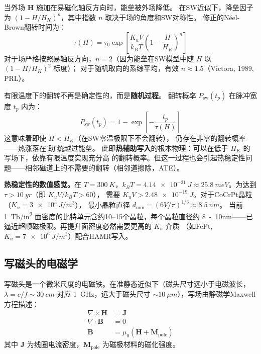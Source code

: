 \documentclass[11pt,a4paper,twoside]{article}
\theoremstyle{definition}
\theoremstyle{plain}
\theoremstyle{remark}
\begin{document}
当外场 $\mathbf{H}$ 施加在易磁化轴反方向时，能垒被外场降低。
在SW近似下，降垒因子为 $(1 - H/H_K)^n$，其中指数 $n$ 取决于场的角度和SW对称性。
修正的N\'{e}el-Brown翻转时间为：
\begin{equation}\label{eq:neel-brown}
  \tau(H) = \tau_0 \exp\!\left[ \frac{K_u V}{k_B T}
            \left( 1 - \frac{H}{H_K} \right)^n \right]
\end{equation}
对于场严格按照易轴反方向，$n = 2$（因为能垒在SW模型中随 $H$ 以 $(1 - H/H_K)^2$ 标度）；
对于随机取向的系综平均，有效 $n \approx 1.5$（Victora, 1989, PRL）。

有限温度下的翻转不再是确定性的，而是\textbf{随机过程}。
翻转概率 $P_{\text{sw}}(t_p)$ 在脉冲宽度 $t_p$ 内为：
\begin{equation}
  P_{\text{sw}}(t_p) = 1 - \exp\!\left[ -\frac{t_p}{\tau(H)} \right]
\end{equation}
这意味着即使 $H < H_K$（在SW零温极限下不会翻转），
仍存在非零的翻转概率——热涨落在\"帮助\"系统越过能垒。
此即\textbf{热辅助写入}的根本物理：可以在低于 $H_K$ 的写场下，依靠有限温度实现充分高
的翻转概率。但这一过程也会引起热稳定性问题——相邻磁道上的不需要的翻转（相邻道擦除，ATE）。

\begin{physbox}
  \textbf{热稳定性的数值感觉。}在 $T=\SI{300}{K}$，$k_B T = \SI{4.14e-21}{J}
  \approx \SI{25.8}{meV}$。为达到 $\tau > \SI{10}{yr}$（即 $K_u V / k_B T > 60$），
  需要 $K_u V > \SI{2.48e-19}{J}$。对于CoCrPt晶粒（$K_u = \SI{3e5}{J/m^3}$），
  最小晶粒直径 $d_{\text{min}} = (6V/\pi)^{1/3} \approx \SI{8.5}{nm}$。
  当前 \SI{1}{Tb/in^2} 面密度的比特单元含约10--15个晶粒，每个晶粒直径约
  \SI{8}{-10}{nm}——已逼近超顺磁极限。再提升面密度必然需要更高的 $K_u$ 介质
  （如FePt, $K_u = \SI{7e6}{J/m^3}$）配合HAMR写入。
\end{physbox}

\subsection{写磁头的电磁学}
\label{sec:write-head}

写磁头是一个微米尺度的电磁铁。在准静态近似下（磁头尺寸远小于电磁波长，
$\lambda = c/f \sim \SI{30}{cm}$ 对应 \SI{1}{GHz}，远大于磁头尺寸
$\sim\SI{10}{\mu m}$），写场由静磁学Maxwell方程描述：
\begin{align}
  \nabla \times \mathbf{H} &= \mathbf{J} \label{eq:ampere} \\
  \nabla \cdot \mathbf{B} &= 0 \label{eq:gauss} \\
  \mathbf{B} &= \mu_0 (\mathbf{H} + \mathbf{M}_{\text{pole}}) \label{eq:constitutive}
\end{align}
其中 $\mathbf{J}$ 为线圈电流密度，$\mathbf{M}_{\text{pole}}$ 为磁极材料的磁化强度。
\end{document}
